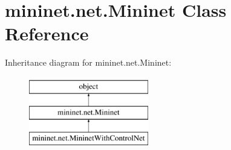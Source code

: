 \hypertarget{classmininet_1_1net_1_1Mininet}{\section{mininet.\-net.\-Mininet Class Reference}
\label{classmininet_1_1net_1_1Mininet}
}
Inheritance diagram for mininet.\-net.\-Mininet\-:\begin{figure}[H]
\begin{center}
\leavevmode
\includegraphics[height=3.000000cm]{classmininet_1_1net_1_1Mininet}
\end{center}
\end{figure}
